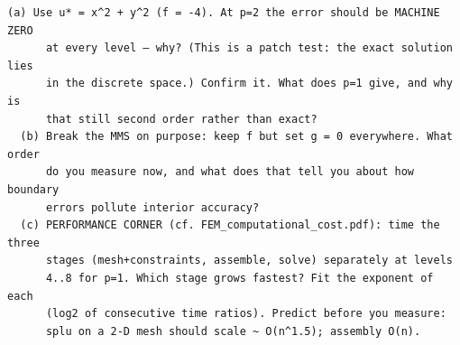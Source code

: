 \begin{explore}
\begin{verbatim}
(a) Use u* = x^2 + y^2 (f = -4). At p=2 the error should be MACHINE ZERO
      at every level — why? (This is a patch test: the exact solution lies
      in the discrete space.) Confirm it. What does p=1 give, and why is
      that still second order rather than exact?
  (b) Break the MMS on purpose: keep f but set g = 0 everywhere. What order
      do you measure now, and what does that tell you about how boundary
      errors pollute interior accuracy?
  (c) PERFORMANCE CORNER (cf. FEM_computational_cost.pdf): time the three
      stages (mesh+constraints, assemble, solve) separately at levels
      4..8 for p=1. Which stage grows fastest? Fit the exponent of each
      (log2 of consecutive time ratios). Predict before you measure:
      splu on a 2-D mesh should scale ~ O(n^1.5); assembly O(n).
\end{verbatim}
\end{explore}
